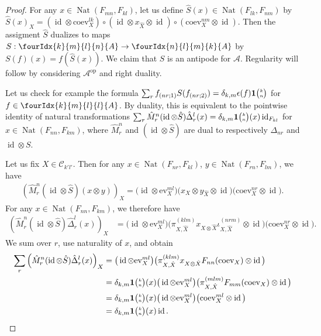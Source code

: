 \documentclass[10pt]{article}
\DeclareMathOperator{\id}{id}
\DeclareMathOperator{\Nat}{\mathrm{Nat}}
\newcommand{\ev}{\mathrm{ev}}
\newcommand{\coev}{\mathrm{coev}}
\newcommand{\Grt}[3]{#1{\tiny {\begin{pmatrix} #2\\#3\end{pmatrix}}}}
\newcommand{\UnitC}[2]{\Grt{\mathbf{1}}{#1}{#2}}
\newcommand{\Gr}[5]{\fourIdx{#2}{#4}{#3}{#5}{#1}}%
\theoremstyle{definition}
\numberwithin{equation}{section}
\begin{document}
\begin{proof} 
  For any $x\in \Nat(F_{mn},F_{kl})$, let us define $\hat{S}(x) \in
  \Nat(F_{lk},F_{nm})$ by $\hat{S}(x)_X = 
(\id \otimes \coev^{lk}_{X}) \circ (\id \otimes x_{\hat X}
  \otimes \id) \circ (\coev^{nm}_{X} \otimes \id).$
Then the assigment $\hat{S}$ dualizes to maps $S:\Gr{A}{k}{l}{m}{n} \rightarrow \Gr{A}{n}{m}{l}{k}$ by $S(f)(x) = f(\hat{S}(x))$. We claim that $S$ is an antipode for $\mathscr{A}$. Regularity will follow by considering $\mathscr{A}^{\textrm{op}}$ and right duality.

Let us check for example the formula $\sum_r f_{(nr;1)} S(f_{(nr;2)}) = \delta_{k,m}\epsilon(f)\UnitC{k}{n}$ for $f\in \Gr{A}{k}{l}{m}{l}$. By duality, this is equivalent to the pointwise identity of natural transformations $\sum_r\hat{M}^n_r(\id\otimes \hat{S})\hat{\Delta}^l_r(x) = \delta_{k,m}\UnitC{k}{n}(x) \id_{F_{kl}}$ for $x\in \Nat(F_{nn},F_{km})$, where $\hat{M}^n_r$ and $(\id\otimes \hat{S})$ are dual to respectively $\Delta_{nr}$ and $\id\otimes S$. 

Let us fix $X\in \mathcal{C}_{k'l'}$. Then for any $x\in
\Nat(F_{nr},F_{kl})$, $y\in \Nat(F_{rn},F_{lm})$, we have
\begin{align*}
  \left(\hat{M}^n_r(\id\otimes \hat{S})(x\otimes y)\right)_X =
\big(\id \otimes \ev_{X}^{ml}\big)  \big(x_{X} \otimes y_{\hat X} \otimes \id\big) 
  \big(\coev_{X}^{nr} \otimes \id\big).
\end{align*}
For any $x\in \Nat(F_{nn},F_{km})$, we therefore have
\begin{align*}
  \left(\hat{M}^n_r(\id\otimes \hat{S})\hat\Delta^{l}_{r}(x)\right)_X &=
\big(\id \otimes \ev^{ml}_{X}\big)  \big(\pi^{(klm)}_{X,\hat X}x_{X\otimes \hat
    X}\iota^{(nrm)}_{X,\hat X} \otimes \id\big) 
  \big(\coev^{nr}_{X} \otimes \id\big).
\end{align*}
We sum over $r$, use naturality of $x$, and obtain
\begin{align*}
\sum_{r}    \left(\hat{M}^n_r(\id\otimes
  \hat{S})\hat\Delta^{l}_{r}(x)\right)_X &=
\big(\id \otimes \ev_{X}^{ml}\big) \big(\pi^{(klm)}_{X,\hat X}x_{X\otimes \hat
    X}F_{nn}(\coev_{X}) \otimes \id\big) \\
  &=\delta_{k,m} \UnitC{k}{n}(x)
\big(\id \otimes \ev_{X}^{ml}\big) 
\big(\pi^{(mlm)}_{X,\hat X}F_{mm}(\coev_{X})
  \otimes \id\big) \\
  &=\delta_{k,m} \UnitC{k}{n}(x)
\big(\id \otimes \ev_{X}^{ml}\big) 
\big(\coev^{ml}_{X}
  \otimes \id\big) \\
  &= \delta_{k,m} \UnitC{k}{n}(x) \id.
\end{align*}
\end{proof} 
\end{document}
